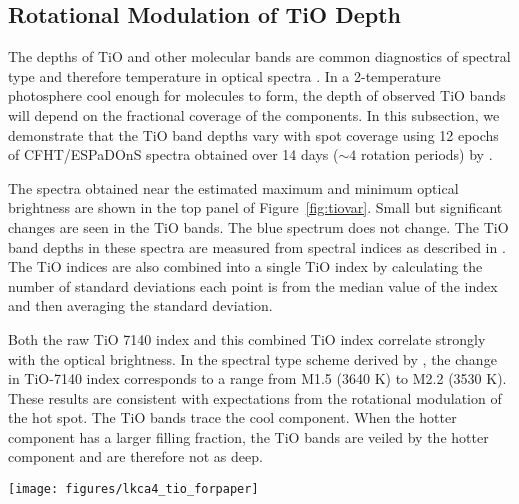 \documentclass[twocolumn]{emulateapj}%
\begin{document}
\subsection{Rotational Modulation of TiO Depth}\label{sec:RotTiO}

The depths of TiO and other molecular bands are common diagnostics of spectral type and therefore temperature in optical spectra \citep[e.g.][]{kirkpatrick91}.  In a 2-temperature photosphere cool enough for molecules to form, the depth of observed TiO bands will depend on the fractional coverage of the components.  In this subsection, we demonstrate that the TiO band depths vary with spot coverage using 12 epochs of CFHT/ESPaDOnS spectra obtained over 14 days ($\sim 4$ rotation periods) by \citet{donati14}.

The spectra obtained near the estimated maximum and minimum optical brightness are shown in the top panel of Figure~\ref{fig:tiovar}.  Small but significant changes are seen in the TiO bands.  The blue spectrum does not change.  The TiO band depths in these spectra are measured from spectral indices as described in \citet{herczeg14}.  The TiO indices are also combined into a single TiO index by calculating the number of standard deviations each point is from the median value of the index and then averaging the standard deviation.  

Both the raw TiO 7140 index and this combined TiO index correlate strongly with the optical brightness.  In the spectral type scheme derived by \citet{herczeg14}, the change in TiO-7140 index corresponds to a range from M1.5 (3640 K) to M2.2 (3530 K).  These results are consistent with expectations from the rotational modulation of the hot spot.  The TiO bands trace the cool component.  When the hotter component has a larger filling fraction, the TiO bands are veiled by the hotter component and are therefore not as deep.


\begin{figure*}
 \centering
 \texttt{[image: figures/lkca4\_tio\_forpaper]}
 \caption{Variability in TiO bands measured with ESPaDOnS.  The V-band emission is estimated from fits to the ASAS-SN lightcurve obtained during the same period.  The main panel shows a correlation between V-band magnitude and the TiO-7140 index, while the inset shows a similar correlation with the average of the TiO 6200, CaH 6800, and TiO 7600 indices.}
 \label{fig:tiovar}
\end{figure*}
\end{document}
